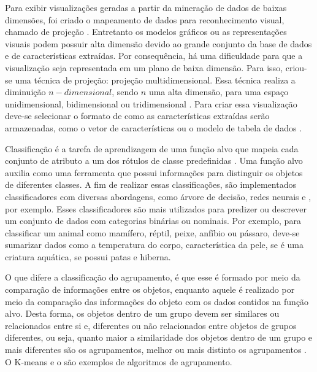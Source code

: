 		Para exibir visualizações geradas a partir da mineração de dados de
		baixas dimensões, foi criado o mapeamento de dados para reconhecimento
		visual, chamado de projeção \cite{friedman1974}. Entretanto os modelos gráficos
		ou as representações visuais podem possuir alta dimensão devido ao grande
		conjunto da base de dados e de características extraídas. Por consequência,
		há uma dificuldade para que a visualização seja representada em um plano de
		baixa dimensão. Para isso, criou-se uma técnica de projeção: projeção
		multidimensional. Essa técnica realiza a diminuição $n-dimensional$, sendo
		$n$ uma alta dimensão, para uma espaço unidimensional, bidimensional ou
		tridimensional \cite{paulovich2008least}. Para criar essa visualização
		deve-se selecionar o formato de como as características extraídas serão
		armazenadas, como o vetor de características ou o modelo de tabela de dados
		\cite{de2003}.
		
		Classificação é a tarefa de aprendizagem de uma função alvo que mapeia cada
		conjunto de atributo a um dos rótulos de classe predefinidas \cite{Tan:2005:ch4}.
		Uma função alvo auxilia como uma ferramenta que possui informações para distinguir
		os objetos de diferentes classes. A fim de realizar essas classificações, são
		implementados classificadores com diversas abordagens, como árvore de decisão,
		redes neurais e , por exemplo. Esses
		classificadores são mais utilizados para predizer ou descrever um conjunto
		de dados com categorias binárias ou nominais. Por exemplo, para classificar
		um animal como mamífero, réptil, peixe, anfíbio ou pássaro, deve-se sumarizar
		dados como a temperatura do corpo, característica da pele, se é uma criatura
		aquática, se possui patas e hiberna.
		
		O que difere a classificação do agrupamento, é que esse é formado por meio da
		comparação de informações entre os objetos, enquanto aquele é realizado por meio
		da comparação das informações do objeto com os dados contidos na função alvo.
		Desta forma, os objetos dentro de um grupo devem ser similares ou relacionados
		entre si e, diferentes ou não relacionados entre objetos de grupos diferentes,
		ou seja, quanto maior a similaridade dos objetos dentro de um grupo e mais
		diferentes são os agrupamentos, melhor ou mais distinto os agrupamentos
		\cite{Tan:2005:ch8}. O K-means \cite{macqueen1967} e o  \cite{Ester1996} são exemplos de algoritmos
		de agrupamento.

